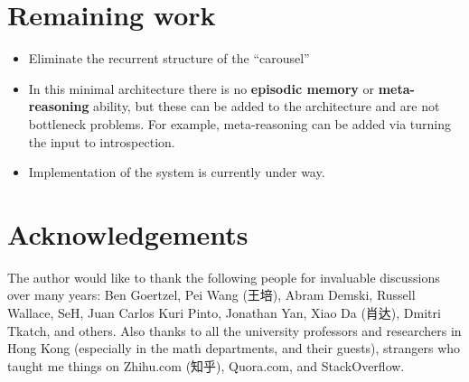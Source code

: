 \documentclass[orivec]{llncs}
\begin{document}



\section{Remaining work}


\begin{itemize}
	\item Eliminate the recurrent structure of the ``carousel''
	\item In this minimal architecture there is no \textbf{episodic memory} or \textbf{meta-reasoning} ability, but these can be added to the architecture and are not bottleneck problems.  For example, meta-reasoning can be added via turning the input to introspection.
	\item Implementation of the system is currently under way.
\end{itemize}

\section*{Acknowledgements}

The author would like to thank the following people for invaluable discussions over many years:  Ben Goertzel, Pei Wang (王培), Abram Demski, Russell Wallace, SeH, Juan Carlos Kuri Pinto, Jonathan Yan, Xiao Da (肖达), Dmitri Tkatch, and others.  Also thanks to all the university professors and researchers in Hong Kong (especially in the math departments, and their guests), strangers who taught me things on Zhihu.com (知乎), Quora.com, and StackOverflow.


\end{document}
